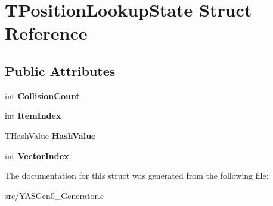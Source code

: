 \hypertarget{struct_t_position_lookup_state}{}\section{T\+Position\+Lookup\+State Struct Reference}
\label{struct_t_position_lookup_state}
\subsection*{Public Attributes}
\begin{DoxyCompactItemize}
\item 
\mbox{\label{struct_t_position_lookup_state_ab90c7e70b02a6f0482d2ef841053e82a}} 
int {\bfseries Collision\+Count}
\item 
\mbox{\label{struct_t_position_lookup_state_a94b64ede6e0f72b38618b55ae3f014c9}} 
int {\bfseries Item\+Index}
\item 
\mbox{\label{struct_t_position_lookup_state_a133021ab7deca7a5a0ff9a0aa3670b16}} 
T\+Hash\+Value {\bfseries Hash\+Value}
\item 
\mbox{\label{struct_t_position_lookup_state_aa0563838b74780d028a25f911513136c}} 
int {\bfseries Vector\+Index}
\end{DoxyCompactItemize}


The documentation for this struct was generated from the following file\+:\begin{DoxyCompactItemize}
\item 
src/Y\+A\+S\+Gen0\+\_\+\+Generator.\+c\end{DoxyCompactItemize}
